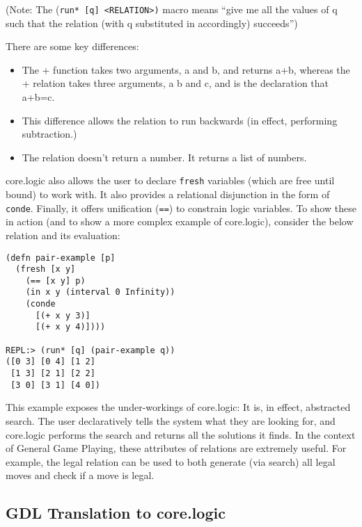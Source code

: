 \documentclass[letterpaper]{article}
\begin{document}
(Note: The (\texttt{run* [q] \textless RELATION\textgreater)} macro means ``give me all the values of q such that the relation (with q substituted in accordingly) succeeds'')

There are some key differences:
\begin{itemize}
\item The + function takes two arguments, a and b, and returns a+b, whereas the + relation takes three arguments, a b and c, and is the declaration that a+b=c.
\item This difference allows the relation to run backwards (in effect, performing subtraction.)
\item The relation doesn't return a number. It returns a list of numbers.
\end{itemize}

core.logic also allows the user to declare \texttt{fresh} variables (which are free until bound) to work with. It also provides a relational disjunction in the form of \texttt{conde}. Finally, it offers unification (\texttt{==}) to constrain logic variables. To show these in action (and to show a more complex example of core.logic), consider the below relation and its evaluation:

\begin{lstlisting}[frame=single, caption=Relation to generate all pairs of whole numbers (x y) such that x+y equals 3 or 4]
(defn pair-example [p]
  (fresh [x y]
    (== [x y] p)
    (in x y (interval 0 Infinity))
    (conde
      [(+ x y 3)]
      [(+ x y 4)])))

REPL:> (run* [q] (pair-example q))
([0 3] [0 4] [1 2]
 [1 3] [2 1] [2 2]
 [3 0] [3 1] [4 0])
\end{lstlisting}

This example exposes the under-workings of core.logic: It is, in effect, abstracted search. The user declaratively tells the system what they are looking for, and core.logic performs the search and returns all the solutions it finds. In the context of General Game Playing, these attributes of relations are extremely useful. For example, the legal relation can be used to both generate (via search) all legal moves and check if a move is legal.

\subsection{GDL Translation to core.logic}
\end{document}
